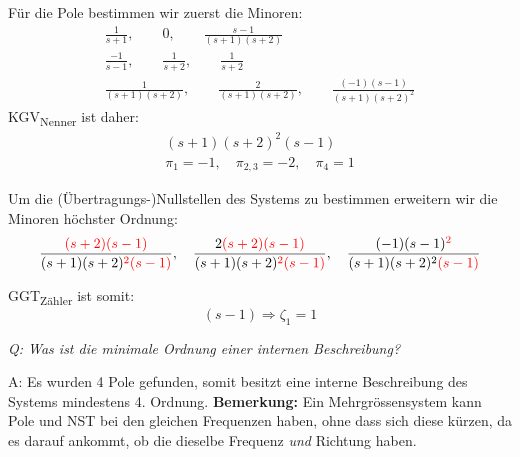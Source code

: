         Für die Pole bestimmen wir zuerst die Minoren:
        \begin{gather*}
            \frac{1}{s+1},\qquad 0,\qquad \frac{s-1}{(s+1)(s+2)}\\
            \frac{-1}{s-1},\qquad \frac{1}{s+2},\qquad \frac{1}{s+2}\\
            \frac{1}{(s+1)(s+2)},\qquad \frac{2}{(s+1)(s+2)},\qquad \frac{(-1)(s-1)}{(s+1)(s+2)^2}
        \end{gather*}
        KGV\textsubscript{Nenner} ist daher:
        \begin{gather*}
            (s+1)(s+2)^2(s-1)\\
            \pi_1 = -1,\quad \pi_{2,3} = -2,\quad \pi_4 = 1
        \end{gather*}
        
        Um die (Übertragungs-)Nullstellen des Systems zu bestimmen erweitern wir die Minoren höchster Ordnung:
        \begin{equation*}
            \frac{\textcolor{red}{(s+2)(s-1)}}{(s+1)(s+2)\textcolor{red}{^2(s-1)}},\quad \frac{2\textcolor{red}{(s+2)(s-1)}}{(s+1)(s+2)\textcolor{red}{^2(s-1)}},\quad \frac{(-1)(s-1)\textcolor{red}{^2}}{(s+1)(s+2)^2\textcolor{red}{(s-1)}}
        \end{equation*}
        
        GGT\textsubscript{Zähler} ist somit:
        \begin{equation*}
            (s-1) \Rightarrow \zeta_1 = 1
        \end{equation*}
        
        \textit{Q: Was ist die minimale Ordnung einer internen Beschreibung?}
        
        A: Es wurden 4 Pole gefunden, somit besitzt eine interne Beschreibung des Systems mindestens 4. Ordnung. \textbf{Bemerkung:} Ein Mehrgrössensystem kann Pole und NST bei den gleichen Frequenzen haben, ohne dass sich diese kürzen, da es darauf ankommt, ob die dieselbe Frequenz \textit{und} Richtung haben.
        